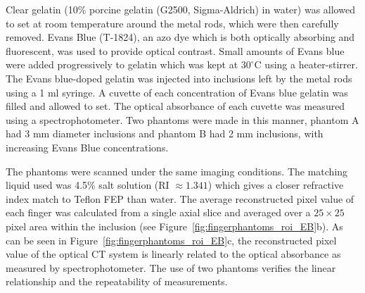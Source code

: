  
Clear gelatin (10\% porcine gelatin (G2500, Sigma-Aldrich) in water) was allowed to set at room temperature around the metal rods, which  were then carefully removed.  Evans Blue (T-1824), an azo dye which is both optically absorbing and  fluorescent, was used to provide optical contrast. Small amounts of Evans blue were added progressively to gelatin which was kept at $30^{\circ}$C using a heater-stirrer. The Evans blue-doped gelatin was injected into inclusions left by the metal rods using a 1 ml syringe. A cuvette of each concentration of Evans blue gelatin  was filled and allowed to set. The optical absorbance of each cuvette was measured using a spectrophotometer. Two phantoms were made in this manner, phantom A had 3 mm diameter inclusions and phantom B had 2 mm inclusions, with increasing Evans Blue concentrations.

The phantoms were scanned under the same imaging conditions. The matching liquid used was 4.5\% salt solution (RI $\approx 1.341$) which  gives a closer refractive index  match to Teflon FEP than water. The average reconstructed pixel value of each finger was calculated from a single axial slice and averaged over a $25 \times 25$ pixel area within the inclusion (see Figure~\ref{fig:fingerphantoms_roi_EB}b).
As can be seen in Figure~\ref{fig:fingerphantoms_roi_EB}c, the reconstructed pixel value of the optical CT system is linearly related to the optical absorbance as measured by  spectrophotometer.   The use of two phantoms verifies the linear relationship and the repeatability of measurements.  

